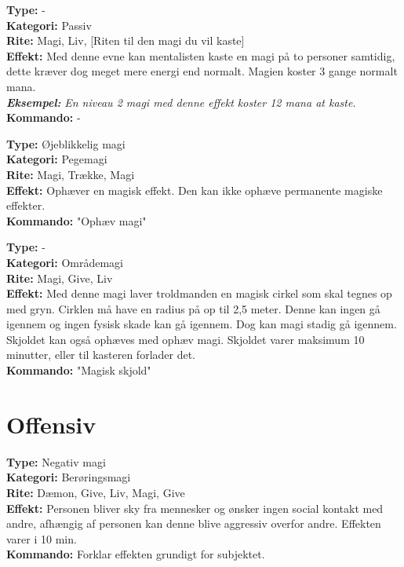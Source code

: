 \begin{primærMagi*}
\textbf{Type:} - \\
\textbf{Kategori:} Passiv\\
\textbf{Rite:} Magi, Liv, [Riten til den magi du vil kaste]\\
\textbf{Effekt:} Med denne evne kan mentalisten kaste en magi på to personer samtidig, dette kræver dog meget mere energi end normalt. Magien koster 3 gange normalt mana. \\
\textit{\textbf{Eksempel:}} \textit{En niveau 2 magi med denne effekt koster 12 mana at kaste.}\\
\textbf{Kommando:} -
\end{primærMagi*}

\begin{primærMagi*}
\textbf{Type:} Øjeblikkelig magi\\
\textbf{Kategori:} Pegemagi\\
\textbf{Rite:} Magi, Trække, Magi\\
\textbf{Effekt:} Ophæver en magisk effekt. Den kan ikke ophæve permanente magiske effekter.\\
\textbf{Kommando:} "Ophæv magi"
\end{primærMagi*}

\begin{primærMagi*}
\textbf{Type:} -\\
\textbf{Kategori:} Områdemagi \\
\textbf{Rite:} Magi, Give, Liv \\
\textbf{Effekt:} Med denne magi laver troldmanden en magisk cirkel som skal tegnes op med gryn. Cirklen må have
en radius på op til 2,5 meter. Denne kan ingen gå igennem og ingen fysisk skade kan gå igennem. Dog kan magi stadig gå igennem. Skjoldet kan også ophæves med ophæv magi. Skjoldet varer maksimum 10 minutter, eller til kasteren forlader det. \\
\textbf{Kommando:} "Magisk skjold"
\end{primærMagi*}

\section*{Offensiv}

\begin{offensiv*}[Aggressiv]
\textbf{Type:} Negativ magi\\
\textbf{Kategori:} Berøringsmagi\\
\textbf{Rite:} Dæmon, Give, Liv, Magi, Give\\ 
\textbf{Effekt:} Personen bliver sky fra mennesker og ønsker ingen social kontakt med andre, afhængig af personen kan denne blive aggressiv overfor andre. Effekten varer i 10 min.\\
\textbf{Kommando:} Forklar effekten grundigt for subjektet.
\end{offensiv*}

